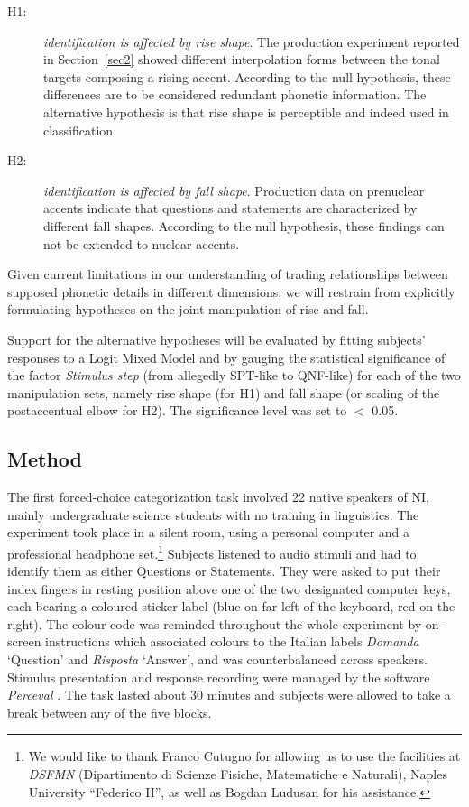 \begin{description}
   \item[H1:] \textit{identification is affected by rise shape}. The production experiment reported in Section~\ref{sec2} showed different interpolation forms between the tonal targets composing a rising accent. According to the null hypothesis, these differences are to be considered redundant phonetic information. The alternative hypothesis is that rise shape is perceptible and indeed used in classification.
   \item[H2:] \textit{identification is affected by fall shape}. Production data on prenuclear accents indicate that questions and statements are characterized by different fall shapes. According to the null hypothesis, these findings can not be extended to nuclear accents.
\end{description}

Given current limitations in our understanding of trading relationships between supposed phonetic details in different dimensions, we will restrain from explicitly formulating hypotheses on the joint manipulation of rise and fall.

Support for the alternative hypotheses will be evaluated by fitting subjects' responses to a Logit Mixed Model and by gauging the statistical significance of the factor \textit{Stimulus step} (from allegedly SPT-like to QNF-like) for each of the two manipulation sets, namely rise shape (for H1) and fall shape (or scaling of the postaccentual elbow for H2). The significance level was set to $<$ 0.05.

\subsection{Method}\label{sec321}
The first forced-choice categorization task involved 22 native speakers of NI, mainly undergraduate science students with no training in linguistics. The experiment took place in a silent room, using a personal computer and a professional headphone set.\footnote{We would like to thank Franco Cutugno for allowing us to use the facilities at \textit{DSFMN} (Dipartimento di Scienze Fisiche, Matematiche e Naturali), Naples University ``Federico II'', as well as Bogdan Ludusan for his assistance.} Subjects listened to audio stimuli and had to identify them as either Questions or Statements. They were asked to put their index fingers in resting position above one of the two designated computer keys, each bearing a coloured sticker label (blue on far left of the keyboard, red on the right). The colour code was reminded throughout the whole experiment by on-screen instructions which associated colours to the Italian labels \textit{Domanda} `Question' and \textit{Risposta} `Answer', and was counterbalanced across speakers. Stimulus presentation and response recording were managed by the software \textit{Perceval} \citep{andre2003perceval}. The task lasted about 30 minutes and subjects were allowed to take a break between any of the five blocks.

